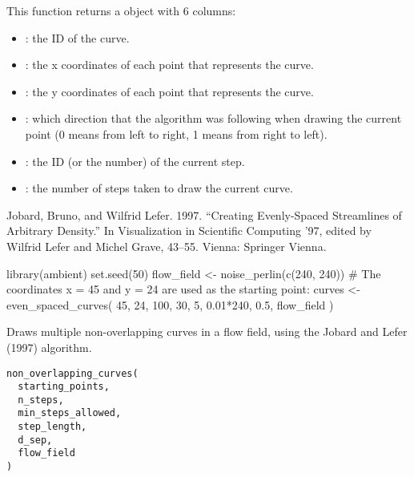 \documentclass[a4paper]{book}
\begin{document}
\begin{Value}
This function returns a  object with 6 columns:
\begin{itemize}

\item{} : the ID of the curve.
\item{} : the x coordinates of each point that represents the curve.
\item{} : the y coordinates of each point that represents the curve.
\item{} : which direction that the algorithm was following when drawing the current point (0 means from left to right, 1 means from right to left).
\item{} : the ID (or the number) of the current step.
\item{} : the number of steps taken to draw the current curve.

\end{itemize}

\end{Value}
%
\begin{References}
Jobard, Bruno, and Wilfrid Lefer. 1997. “Creating Evenly-Spaced Streamlines of Arbitrary Density.” In Visualization in Scientific Computing ’97, edited by Wilfrid Lefer and Michel Grave, 43–55. Vienna: Springer Vienna.
\end{References}
%
\begin{Examples}
\begin{ExampleCode}
library(ambient)
set.seed(50)
flow_field <- noise_perlin(c(240, 240))
# The coordinates x = 45 and y = 24 are used as the starting point:
curves <- even_spaced_curves(
  45, 24,
  100,
  30,
  5,
  0.01*240,
  0.5,
  flow_field
)

\end{ExampleCode}
\end{Examples}
%
\begin{Description}
Draws multiple non-overlapping curves in a flow field,
using the Jobard and Lefer (1997) algorithm.
\end{Description}
%
\begin{Usage}
\begin{verbatim}
non_overlapping_curves(
  starting_points,
  n_steps,
  min_steps_allowed,
  step_length,
  d_sep,
  flow_field
)
\end{verbatim}
\end{Usage}
\end{document}
